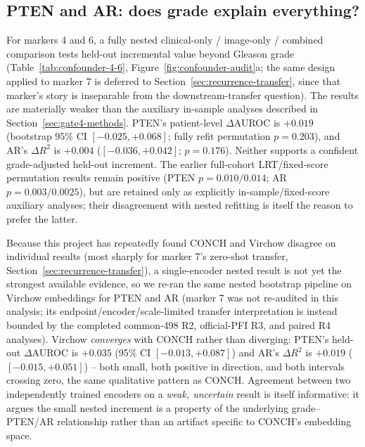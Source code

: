 \label{sec:confounder-audits}

\subsection{PTEN and AR: does grade explain everything?}

For markers 4 and 6, a fully nested clinical-only / image-only / combined comparison tests
held-out incremental value beyond Gleason grade (Table~\ref{tab:confounder-4-6},
Figure~\ref{fig:confounder-audit}a; the same design applied to marker 7 is deferred to
Section~\ref{sec:recurrence-transfer}, since that marker's story is inseparable from the
downstream-transfer question). The results are materially weaker than the auxiliary in-sample
analyses described in Section~\ref{sec:gate4-methods}. PTEN's patient-level $\Delta$AUROC is
$+0.019$ (bootstrap 95\% CI $[-0.025,+0.068]$; fully refit permutation $p=0.203$), and AR's
$\Delta R^2$ is $+0.004$ ($[-0.036,+0.042]$; $p=0.176$). Neither supports a confident
grade-adjusted held-out increment. The earlier full-cohort LRT/fixed-score permutation results
remain positive (PTEN $p=0.010/0.014$; AR $p=0.003/0.0025$), but are retained only as
explicitly in-sample/fixed-score auxiliary analyses; their disagreement with nested refitting
is itself the reason to prefer the latter.

Because this project has repeatedly found CONCH and Virchow disagree on individual results
(most sharply for marker 7's zero-shot transfer, Section~\ref{sec:recurrence-transfer}), a
single-encoder nested result is not yet the strongest available evidence, so we re-ran the same
nested bootstrap pipeline on Virchow embeddings for PTEN and AR (marker 7 was not re-audited
in this analysis; its endpoint/encoder/scale-limited transfer interpretation is instead bounded
by the completed common-498 R2, official-PFI R3, and paired R4 analyses). Virchow
\emph{converges} with CONCH rather than diverging: PTEN's held-out $\Delta$AUROC is $+0.035$
(95\% CI $[-0.013,+0.087]$) and AR's $\Delta R^2$ is $+0.019$ ($[-0.015,+0.051]$) -- both
small, both positive in direction, and both intervals crossing zero, the same qualitative
pattern as CONCH. Agreement between two independently trained encoders on a \emph{weak,
uncertain} result is itself informative: it argues the small nested increment is a property of
the underlying grade--PTEN/AR relationship rather than an artifact specific to CONCH's
embedding space.

